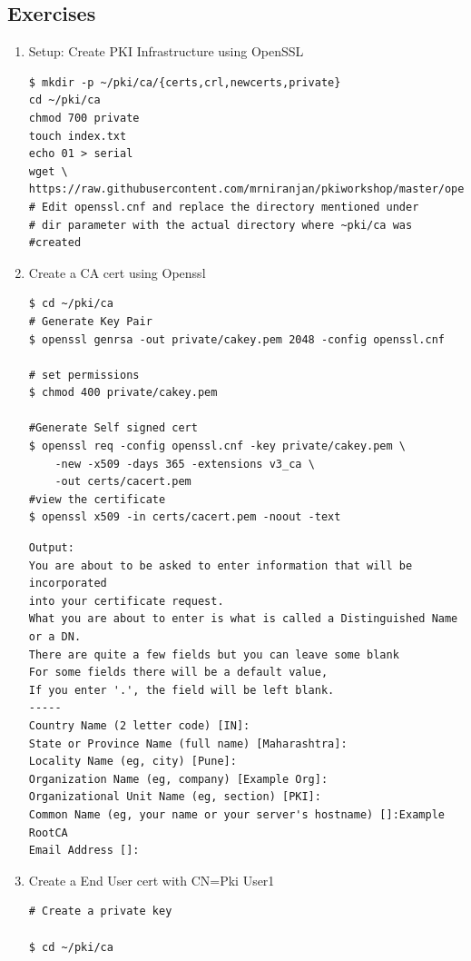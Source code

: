 \documentclass[12pt]{report}
\begin{document}
    \subsection{Exercises}
\begin{enumerate}[label*=\arabic*.]
    \item Setup: Create PKI Infrastructure using OpenSSL
        \begin{lstlisting}[style=BashInputStyle]
$ mkdir -p ~/pki/ca/{certs,crl,newcerts,private}
cd ~/pki/ca
chmod 700 private
touch index.txt
echo 01 > serial
wget \
https://raw.githubusercontent.com/mrniranjan/pkiworkshop/master/openssl.cnf
# Edit openssl.cnf and replace the directory mentioned under
# dir parameter with the actual directory where ~pki/ca was
#created
        \end{lstlisting}
    \item Create a CA cert using Openssl
        \begin{lstlisting}[style=BashInputStyle]
$ cd ~/pki/ca
# Generate Key Pair
$ openssl genrsa -out private/cakey.pem 2048 -config openssl.cnf

# set permissions
$ chmod 400 private/cakey.pem

#Generate Self signed cert
$ openssl req -config openssl.cnf -key private/cakey.pem \
    -new -x509 -days 365 -extensions v3_ca \
    -out certs/cacert.pem
#view the certificate    
$ openssl x509 -in certs/cacert.pem -noout -text
        \end{lstlisting}
        \begin{lstlisting}
Output:
You are about to be asked to enter information that will be incorporated
into your certificate request.
What you are about to enter is what is called a Distinguished Name or a DN.
There are quite a few fields but you can leave some blank
For some fields there will be a default value,
If you enter '.', the field will be left blank.
-----
Country Name (2 letter code) [IN]:
State or Province Name (full name) [Maharashtra]:
Locality Name (eg, city) [Pune]:
Organization Name (eg, company) [Example Org]:
Organizational Unit Name (eg, section) [PKI]:
Common Name (eg, your name or your server's hostname) []:Example RootCA
Email Address []:
        \end{lstlisting}
    \item Create a End User cert with CN=Pki User1
        \begin{lstlisting}[style=BashInputStyle]
# Create a private key
        
$ cd ~/pki/ca
        

\end{lstlisting}
\end{enumerate}
\end{document}
